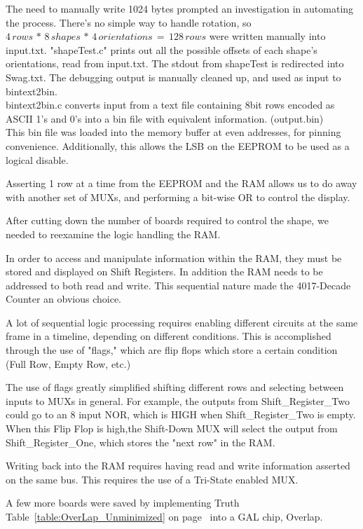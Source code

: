 \documentclass[letterpaper,titlepage,oneside]{article}
\begin{document}
The need to manually write 1024 bytes prompted an investigation in automating the process. There's no simple way to handle rotation, so
$ 4 \,rows\, *\, 8\, shapes\, *\, 4 \,orientations \,=\, 128\, rows$
were written manually into input.txt. "shapeTest.c" prints out all the possible offsets of each shape's orientations, read from input.txt. The stdout from shapeTest is redirected into Swag.txt. The debugging output is manually cleaned up, and used as input to bintext2bin.\\
bintext2bin.c converts input from a text file containing 8bit rows encoded as ASCII 1's and 0's into a bin file with equivalent information. (output.bin)\\
This bin file was loaded into the memory buffer at even addresses, for pinning convenience. Additionally, this allows the LSB on the EEPROM to be used as a logical disable.

Asserting 1 row at a time from the EEPROM and the RAM allows us to do away with another set of MUXs, and performing a bit-wise OR to control the display.

After cutting down the number of boards required to control the shape, we needed to reexamine the logic handling the RAM.

In order to access and manipulate information within the RAM, they must be stored and displayed on Shift Registers. In addition the RAM needs to be addressed to both read and write. This sequential nature made the 4017-Decade Counter an obvious choice.

A lot of sequential logic processing requires enabling different circuits at the same frame in a timeline, depending on different conditions. This is accomplished through the use of "flags," which are flip flops which store a certain condition (Full Row, Empty Row, etc.)

The use of flags greatly simplified shifting different rows and selecting between inputs to MUXs in general. For example, the outputs from Shift\_Register\_Two could go to an 8 input NOR, which is HIGH when Shift\_Register\_Two is empty. When this Flip Flop is high,the Shift-Down MUX will select the output from Shift\_Register\_One, which stores the "next row" in the RAM. 

Writing back into the RAM requires having read and write information asserted on the same bus. This requires the use of a Tri-State enabled MUX.

A few more boards were saved by implementing Truth Table~\ref{table:OverLap_Unminimized} on page~\pageref{table:OverLap_Unminimized}
 into a GAL chip, Overlap.
 
\end{document}
